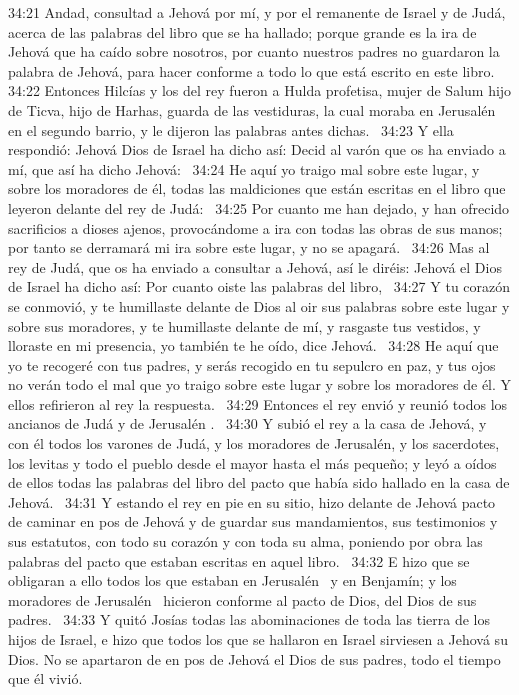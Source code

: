 																																		34:21 Andad, consultad a Jehová por mí, y por el remanente de Israel y de Judá, acerca de las palabras del libro que se ha hallado; porque grande es la ira de Jehová que ha caído sobre nosotros, por cuanto nuestros padres no guardaron la palabra de Jehová, para hacer conforme a todo lo que está escrito en este libro.  
																																		34:22 Entonces Hilcías y los del rey fueron a Hulda profetisa, mujer de Salum hijo de Ticva, hijo de Harhas, guarda de las vestiduras, la cual moraba en Jerusalén  en el segundo barrio, y le dijeron las palabras antes dichas.  
																																		34:23 Y ella respondió: Jehová Dios de Israel ha dicho así: Decid al varón que os ha enviado a mí, que así ha dicho Jehová:  
																																		34:24 He aquí yo traigo mal sobre este lugar, y sobre los moradores de él, todas las maldiciones que están escritas en el libro que leyeron delante del rey de Judá:  
																																		34:25 Por cuanto me han dejado, y han ofrecido sacrificios a dioses ajenos, provocándome a ira con todas las obras de sus manos; por tanto se derramará mi ira sobre este lugar, y no se apagará.  
																																		34:26 Mas al rey de Judá, que os ha enviado a consultar a Jehová, así le diréis: Jehová el Dios de Israel ha dicho así: Por cuanto oiste las palabras del libro,  
																																		34:27 Y tu corazón se conmovió, y te humillaste delante de Dios al oir sus palabras sobre este lugar y sobre sus moradores, y te humillaste delante de mí, y rasgaste tus vestidos, y lloraste en mi presencia, yo también te he oído, dice Jehová.  
																																		34:28 He aquí que yo te recogeré con tus padres, y serás recogido en tu sepulcro en paz, y tus ojos no verán todo el mal que yo traigo sobre este lugar y sobre los moradores de él. Y ellos refirieron al rey la respuesta.  
																																		34:29 Entonces el rey envió y reunió todos los ancianos de Judá y de Jerusalén .  
																																		34:30 Y subió el rey a la casa de Jehová, y con él todos los varones de Judá, y los moradores de Jerusalén, y los sacerdotes, los levitas y todo el pueblo desde el mayor hasta el más pequeño; y leyó a oídos de ellos todas las palabras del libro del pacto que había sido hallado en la casa de Jehová.  
																																		34:31 Y estando el rey en pie en su sitio, hizo delante de Jehová pacto de caminar en pos de Jehová y de guardar sus mandamientos, sus testimonios y sus estatutos, con todo su corazón y con toda su alma, poniendo por obra las palabras del pacto que estaban escritas en aquel libro.  
																																		34:32 E hizo que se obligaran a ello todos los que estaban en Jerusalén  y en Benjamín; y los moradores de Jerusalén  hicieron conforme al pacto de Dios, del Dios de sus padres.  
																																		34:33 Y quitó Josías todas las abominaciones de toda las tierra de los hijos de Israel, e hizo que todos los que se hallaron en Israel sirviesen a Jehová su Dios. No se apartaron de en pos de Jehová el Dios de sus padres, todo el tiempo que él vivió.  
